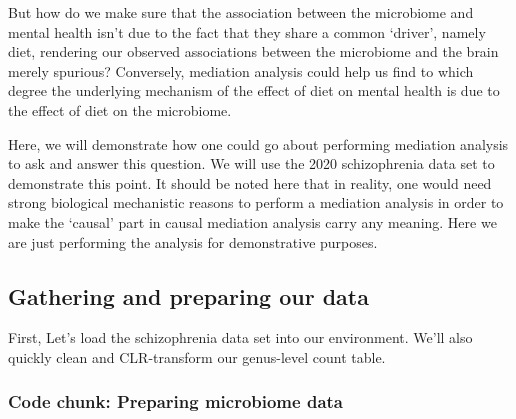 \documentclass[
]{article}
\begin{document}
But how do we make sure that the association between the microbiome and
mental health isn't due to the fact that they share a common `driver',
namely diet, rendering our observed associations between the microbiome
and the brain merely spurious? Conversely, mediation analysis could help
us find to which degree the underlying mechanism of the effect of diet
on mental health is due to the effect of diet on the microbiome.

Here, we will demonstrate how one could go about performing mediation
analysis to ask and answer this question. We will use the 2020
schizophrenia data set to demonstrate this point. It should be noted
here that in reality, one would need strong biological mechanistic
reasons to perform a mediation analysis in order to make the `causal'
part in causal mediation analysis carry any meaning. Here we are just
performing the analysis for demonstrative purposes.

\hypertarget{gathering-and-preparing-our-data}{%
\subsection{Gathering and preparing our
data}\label{gathering-and-preparing-our-data}}

First, Let's load the schizophrenia data set into our environment. We'll
also quickly clean and CLR-transform our genus-level count table.

\hypertarget{code-chunk-preparing-microbiome-data}{%
\subsubsection{Code chunk: Preparing microbiome
data}\label{code-chunk-preparing-microbiome-data}}
\end{document}
